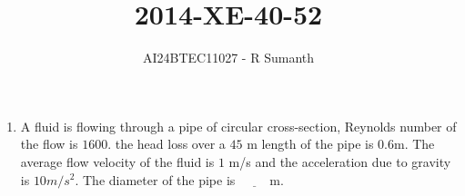 \documentclass[journal,12pt,onecolumn]{IEEEtran}
\theoremstyle{remark}
\begin{document}

\vspace{3cm}

\title{\textbf{2014-XE-40-52}}
\author{AI24BTEC11027 - R Sumanth}
\maketitle
\bigskip

\renewcommand{\thefigure}{\theenumi}
\renewcommand{\thetable}{\theenumi}
\setlength{\columnsep}{2.5em}
\begin{enumerate}

\item A fluid is flowing through a pipe of circular cross-section, Reynolds number of the flow is $1600$. the head loss over a $45$ m length of the pipe is $0.6 $m. The average flow velocity of the fluid is $1$ m/s and the acceleration due to gravity is $10 m/s^2$. The diameter of the pipe is $\underline{\hspace{1cm}}$m.\\


\end{enumerate}
\end{document}
